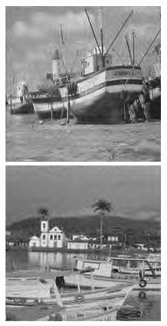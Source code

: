 \begin{figure}[!htbp]
{{\begin{minipage}[b]{0.23\linewidth}
\end{minipage}}
\begin{minipage}[b]{0.23\linewidth}
\includegraphics[width=1\linewidth]{images/gmca_out1.png}\vspace{4pt}
\includegraphics[width=1\linewidth]{images/gmca_out2.png}\vspace{4pt}

\end{minipage}}
\end{figure}
